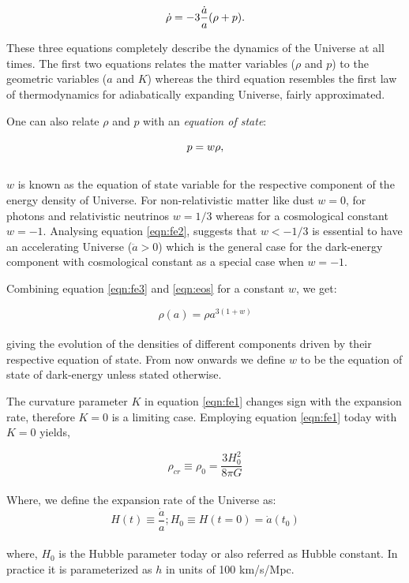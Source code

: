 \begin{equation}
\centering
\dot{\rho} = -3 \dfrac{\dot{a}}{a}(\rho + p).
\label{eqn:fe3}
\end{equation}

These three equations completely describe the dynamics of the Universe at all times.
The first two equations relates the matter variables ($\rho$ and $p$) to the geometric
variables ($a$ and $K$) whereas the third equation resembles the first law of 
thermodynamics for adiabatically expanding Universe, fairly approximated.

One can also relate $\rho$ and $p$ with an {\it equation of state}:

\begin{equation}
\centering
p = w \rho,
\label{eqn:eos}
\end{equation}
\\
$w$ is known as the equation of state variable for the respective component
of the energy density of Universe. For non-relativistic matter like dust $w=0$,
for photons and relativistic neutrinos $w=1/3$ whereas for a cosmological constant
$w=-1$. Analysing equation \ref{eqn:fe2}, suggests that $w<-1/3$ is essential to
have an accelerating Universe ($\ddot{a}>0$) which is the general case for the
dark-energy component with cosmological constant as a special case when $w=-1$.

Combining equation \ref{eqn:fe3} and \ref{eqn:eos} for a constant $w$, we get:

\begin{equation}
	\rho(a) = \rho a^{3(1+w)}
	\label{eqn:rho_t}
\end{equation}
\\
giving the evolution of the densities of different components driven by their 
respective equation of state. From now onwards we define $w$ to be the equation of 
state of dark-energy unless stated otherwise.

The curvature parameter $K$ in equation \ref{eqn:fe1} changes sign with the expansion 
rate, therefore $K=0$ is a limiting case. Employing equation \ref{eqn:fe1} today with
$K=0$ yields,

\begin{equation}
	\rho_{cr} \equiv \rho_0 = \dfrac{3H_0^2}{8\pi G}
\end{equation}
\\
Where, we define the expansion rate of the Universe as:
\begin{equation}
	H(t) \equiv \dfrac{\dot{a}}{a}; H_0 \equiv H(t=0) = \dot{a}(t_0)
\end{equation}
\\
where, $H_0$ is the Hubble parameter today or also referred as Hubble constant. In 
practice it is parameterized as $h$ in units of 100 km/s/Mpc.

